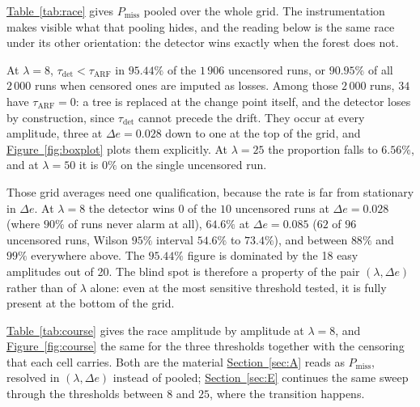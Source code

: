 \documentclass[10pt,conference]{IEEEtran}
\theoremstyle{definition}
\begin{document}
\hyperref[tab:race]{Table~\ref*{tab:race}} gives $P_{\mathrm{miss}}$ pooled over the whole grid. The
instrumentation makes visible what that pooling hides, and the reading below is the same
race under its other orientation: the detector wins exactly when the forest does not.

At $\lambda = 8$, $\tau_{\mathrm{det}} < \tau_{\mathrm{ARF}}$ in $95.44\%$ of the $1\,906$
uncensored runs, or $90.95\%$ of all $2\,000$ runs when censored ones are imputed as
losses. Among those $2\,000$ runs, $34$ have $\tau_{\mathrm{ARF}} = 0$: a tree is replaced
at the change point itself, and the detector loses by construction, since
$\tau_{\mathrm{det}}$ cannot precede the drift. They occur at every amplitude, three at
$\Delta e = 0.028$ down to one at the top of the grid, and \hyperref[fig:boxplot]{Figure~\ref*{fig:boxplot}} plots
them explicitly. At $\lambda = 25$ the proportion falls to $6.56\%$, and at $\lambda = 50$
it is $0\%$ on the single uncensored run.

Those grid averages need one qualification, because the rate is far from stationary in
$\Delta e$. At $\lambda = 8$ the detector wins $0$ of the $10$ uncensored runs at
$\Delta e = 0.028$ (where $90\%$ of runs never alarm at all), $64.6\%$ at
$\Delta e = 0.085$ ($62$ of $96$ uncensored runs, Wilson $95\%$ interval $54.6\%$ to
$73.4\%$), and between $88\%$ and $99\%$ everywhere above. The $95.44\%$ figure is
dominated by the 18 easy amplitudes out of 20. The blind spot is therefore a property of
the pair $(\lambda, \Delta e)$ rather than of $\lambda$ alone: even at the most sensitive
threshold tested, it is fully present at the bottom of the grid.

\hyperref[tab:course]{Table~\ref*{tab:course}} gives the race amplitude by amplitude at $\lambda = 8$, and
\hyperref[fig:course]{Figure~\ref*{fig:course}} the same for the three thresholds together with the censoring that
each cell carries. Both are the material \hyperref[sec:A]{Section~\ref*{sec:A}} reads as $P_{\mathrm{miss}}$,
resolved in $(\lambda, \Delta e)$ instead of pooled; \hyperref[sec:E]{Section~\ref*{sec:E}} continues the
same sweep through the thresholds between $8$ and $25$, where the transition happens.
\end{document}
